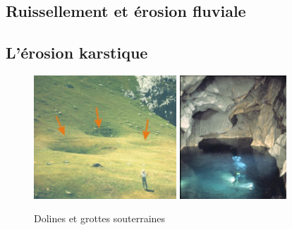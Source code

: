 \documentclass{beamer}
\begin{document}
\subsection{Ruissellement et érosion fluviale}
\begin{frame}
 \begin{center}
  \begin{figure}
  \end{figure}
 \end{center}
\end{frame}

\subsection{L'érosion karstique}
\begin{frame}
  \begin{center}
    \begin{figure}[h]
      \includegraphics[width=5.35cm]{Images/Diapos/Erosion/Karstique/dolines.jpg}
      \includegraphics[width=4cm]{Images/Diapos/Erosion/Karstique/erosion-karstique-fig04.jpg}
      \caption{Dolines et grottes souterraines}
    \end{figure}
  \end{center}
\end{frame}
\end{document}
